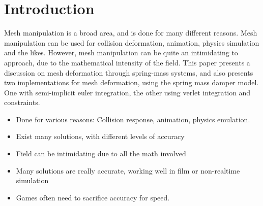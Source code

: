 \chapter{Introduction}
\label{chap:introduction}
Mesh manipulation is a broad area, and is done for many different reasons.
Mesh manipulation can be used for collision deformation, animation, physics simulation and the likes. 
However, mesh manipulation can be quite an intimidating to approach, due to the mathematical intensity of the field.
This paper presents a discussion on mesh deformation through spring-mass systems, and also presents two implementations for mesh deformation,
using the spring mass damper model. One with semi-implicit euler integration, the other using verlet integration and constraints.

\think
{
    \begin{itemize}
        \item Done for various reasons: Collision response, animation, physics emulation.
        \item Exist many solutions, with different levels of accuracy
        \item Field can be intimidating due to all the math involved
        \item Many solutions are really accurate, working well in film or non-realtime simulation
        \item Games often need to sacrifice accuracy for speed.
    \end{itemize}
}
